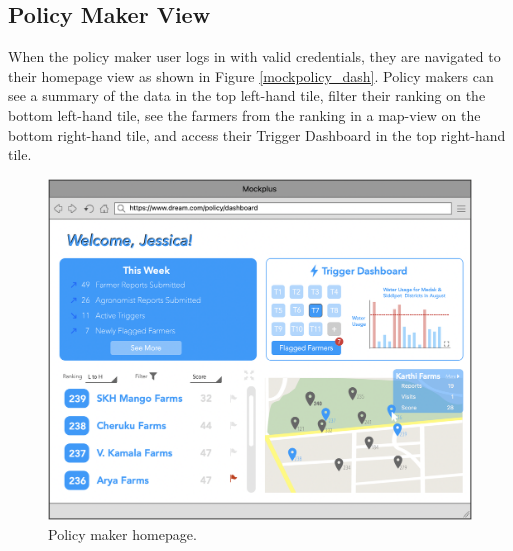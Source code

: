 \newpage
\subsection{Policy Maker View}
\begin{flushleft}
When the policy maker user logs in with valid credentials, they are navigated to their homepage view as shown in Figure \ref{mockpolicy_dash}. Policy makers can see a summary of the data in the top left-hand tile, filter their ranking on the bottom left-hand tile, see the farmers from the ranking in a map-view on the bottom right-hand tile, and access their Trigger Dashboard in the top right-hand tile. 
\end{flushleft}

\begin{figure}[H]
\centering
\includegraphics[scale=0.5]{../images_diagrams/mock_ups/policydash100.png}
\caption{\label{fig:mockpolicy_dash}Policy maker homepage.}
\end{figure}

